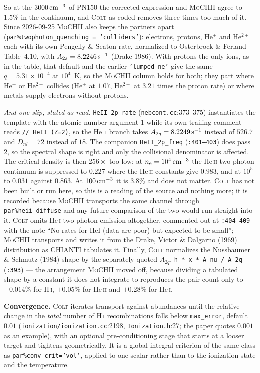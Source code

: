 \documentclass[english,a4paper]{my_memo}
\newcommand{\code}[1]{\texttt{#1}}
\newcommand{\MoCHII}{\textsc{MoCHII}}
\newcommand{\Colt}{\textsc{Colt}}
\newcommand{\HI}{H\,\textsc{i}}
\newcommand{\HeI}{He\,\textsc{i}}
\newcommand{\HeII}{He\,\textsc{ii}}
\newcommand{\nelec}{n_{\rm e}}
\begin{document}
\noindent
So at the $3000\,{\rm cm^{-3}}$ of PN150 the corrected expression and
\MoCHII{} agree to $1.5\%$ in the continuum, and \Colt{} as coded removes
three times too much of it.  Since 2026-09-25 \MoCHII{} also keeps the
partners apart (\code{par\%twophoton\_quenching = 'colliders'}): electrons,
protons, He$^+$ and He$^{2+}$ each with its own Pengelly \& Seaton rate,
normalized to Osterbrock \& Ferland Table~4.10, with $A_{2s} = 8.2246\,{\rm
s^{-1}}$ (Drake 1986).  With protons the only ions, as in the table, that
default and the earlier \code{'lumped\_ne'} give the same $q = 5.31{\times}
10^{-4}$ at $10^4$~K, so the \MoCHII{} column holds for both; they part where
He$^+$ or He$^{2+}$ collides (He$^+$ at $1.07$, He$^{2+}$ at $3.21$ times the
proton rate) or where metals supply electrons without protons.

\emph{And one slip, stated as read.}  \code{HeII\_2p\_rate}
(\code{nebcont.cc}:373--375) instantiates the template with the atomic
number argument $1$ while its own trailing comment reads
\code{// HeII (Z=2)}, so the \HeII{} branch takes
$A_{2q} = 8.2249\,{\rm s^{-1}}$ instead of $526.7$ and $D_{nl} = 72$
instead of $18$.  The companion \code{HeII\_2p\_freq} (\code{:401--403})
does pass $2$, so the spectral shape is right and only the collisional
denominator is affected.  The critical density is then $256\times$ too
low: at $\nelec = 10^4\,{\rm cm^{-3}}$ the \HeII{} two-photon continuum is
suppressed to $0.227$ where the \HeII{} constants give $0.983$, and at
$10^5$ to $0.031$ against $0.863$.  At $100\,{\rm cm^{-3}}$ it is $3.8\%$
and does not matter.  \Colt{} has not been built or run here, so this is a
reading of the source and nothing more; it is recorded because \MoCHII{}
transports the same channel through
\code{par\%heii\_diffuse} and any future comparison of the two would run
straight into it.  \Colt{} omits \HeI{} two-photon emission altogether,
commented out at \code{:404--409} with the note ``No rates for HeI (data
are poor) but expected to be small''; \MoCHII{} transports and writes it
from the Drake, Victor \& Dalgarno (1969) distribution as CHIANTI
tabulates it.  Finally, \Colt{} normalizes the Nussbaumer \& Schmutz (1984)
shape by the separately quoted $A_{2q}$, \code{h * x * A\_nu / A\_2q}
(\code{:393}) --- the arrangement \MoCHII{} moved off, because dividing a
tabulated shape by a constant it does not integrate to reproduces the pair
count only to $-0.014\%$ for \HI{}, $+0.05\%$ for \HeII{} and $+0.28\%$
for \HeI{}.

\textbf{Convergence.}  \Colt{} iterates transport against abundances until
the relative change in the \emph{total} number of \HI{} recombinations
falls below \code{max\_error}, default $0.01$
(\code{ionization/\allowbreak ionization.cc}:2198, \code{Ionization.h}:27; the paper
quotes $0.001$ as an example), with an optional pre-conditioning stage
that starts at a looser target and tightens geometrically.  It is a
global integral criterion of the same class as
\code{par\%conv\_crit='vol'}, applied to one scalar rather than to the
ionization state and the temperature.
\end{document}

